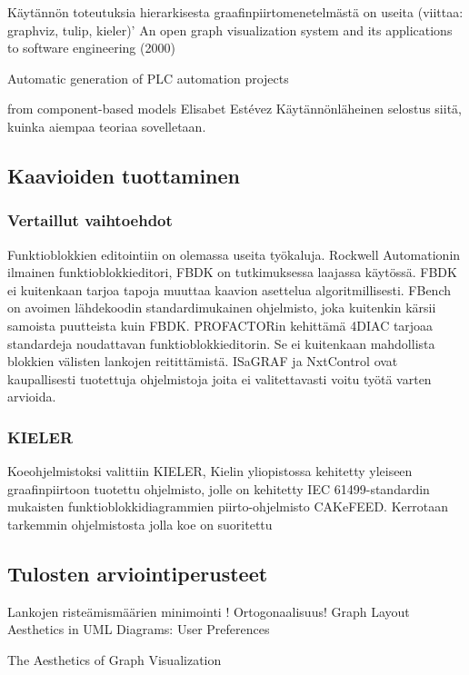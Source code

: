 \documentclass[finnish,12pt]{article}
\begin{document}
Käytännön toteutuksia hierarkisesta graafinpiirtomenetelmästä on useita (viittaa: graphviz, tulip, kieler)’
An open graph visualization system and its applications to software engineering (2000) 

Automatic generation of PLC automation projects

from component-based models
Elisabet Estévez
Käytännönläheinen selostus siitä, kuinka aiempaa teoriaa sovelletaan.

		\subsection{Kaavioiden tuottaminen}
			\subsubsection{Vertaillut vaihtoehdot}
	
Funktioblokkien editointiin on olemassa useita työkaluja.
Rockwell Automationin ilmainen funktioblokkieditori, FBDK on tutkimuksessa laajassa käytössä.
FBDK ei kuitenkaan tarjoa tapoja muuttaa kaavion asettelua algoritmillisesti.
FBench on avoimen lähdekoodin standardimukainen ohjelmisto, joka kuitenkin kärsii samoista puutteista kuin FBDK.
PROFACTORin kehittämä 4DIAC tarjoaa standardeja noudattavan funktioblokkieditorin.
Se ei kuitenkaan mahdollista blokkien välisten lankojen reitittämistä.
ISaGRAF ja NxtControl ovat kaupallisesti tuotettuja ohjelmistoja joita ei valitettavasti voitu työtä varten arvioida.

			\subsubsection{KIELER}

Koeohjelmistoksi valittiin KIELER, Kielin yliopistossa kehitetty yleiseen graafinpiirtoon tuotettu ohjelmisto, jolle on kehitetty IEC 61499-standardin mukaisten funktioblokkidiagrammien piirto-ohjelmisto CAKeFEED. 
Kerrotaan tarkemmin ohjelmistosta jolla koe on suoritettu

		\subsection{Tulosten arviointiperusteet}

Lankojen risteämismäärien minimointi !
Ortogonaalisuus!
Graph Layout Aesthetics in UML Diagrams: User Preferences

The Aesthetics of Graph Visualization

	\clearpage
\end{document}

